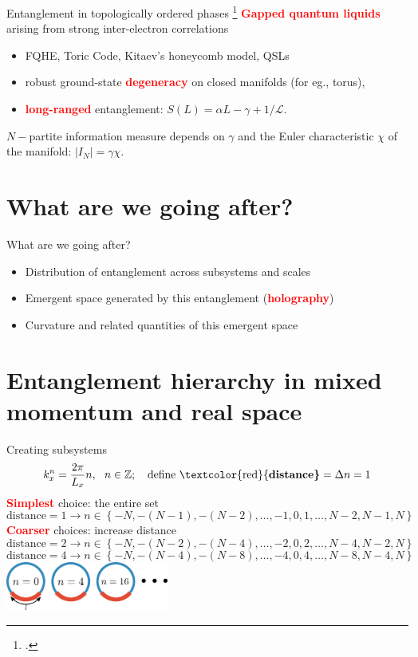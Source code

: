 \documentclass[12pt,aspectratio=169]{beamer}
\newcommand{\focus}[1]{\textcolor{red}{\bf{#1}}}
\begin{document}
\begin{frame}{Entanglement in topologically ordered phases}
	\footcite{wen_1989,kitaev2006topological,Patra2022}
	\focus{Gapped quantum liquids} arising from strong inter-electron correlations\\[10pt]
	\begin{itemize}
		\item FQHE, Toric Code, Kitaev's honeycomb model, QSLs\\[10pt]
		\item robust ground-state \focus{degeneracy} on closed manifolds (for eg., torus),\\[10pt]
		\item \focus{long-ranged} entanglement: \(S(L) = \alpha L - \gamma + \mathcal{1/L}\).\\[10pt]
	\end{itemize}
	\(N-\)partite information measure depends on \(\gamma\) and the Euler characteristic \(\chi\) of the manifold: \(|I_N| = \gamma \chi\).
\end{frame}

\section{What are we going after?}

\begin{frame}{What are we going after?}
	\begin{itemize}
		\item Distribution of entanglement across subsystems and scales\\[20pt]
		\item Emergent space generated by this entanglement (\focus{holography})\\[20pt]
		\item Curvature and related quantities of this emergent space
	\end{itemize}

\end{frame}

\section{Entanglement hierarchy in mixed momentum and real space}

\begin{frame}{Creating subsystems}
	\[k_x^n = \frac{2\pi }{L_x} n,~ ~ n \in \mathbb{Z};~~~ \text{define \focus{distance}} = \Delta n = 1\]
	\focus{Simplest} choice: the entire set
	\[\text{distance} = 1 \longrightarrow n \in \left\{-N,-(N-1),-(N-2),\ldots,-1,0,1,\ldots,N-2,N-1,N\right\} \]
	\focus{Coarser} choices: increase distance
	\[\text{distance} = 2 \longrightarrow n \in \left\{-N,-(N-2),-(N-4),\ldots,-2,0,2,\ldots,N-4,N-2,N\right\} \]
	\[\text{distance} = 4 \longrightarrow n \in \left\{-N,-(N-4),-(N-8),\ldots,-4,0,4,\ldots,N-8,N-4,N\right\} \]
	\centering
	\vspace*{\fill}
	\includegraphics[width=0.4\textwidth]{figures/A_mi.pdf}
\end{frame}
\end{document}
